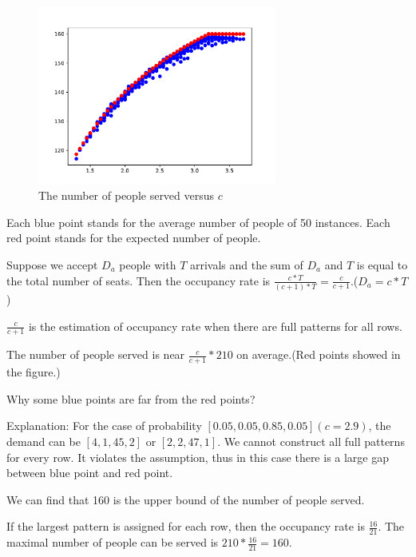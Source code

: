 \begin{figure}[ht]
  \centering
  \includegraphics[width = 0.7\textwidth]{./Figures/diff_2.pdf}
  \caption{The number of people served versus $c$}
\end{figure}

Each blue point stands for the average number of people of 50 instances.
Each red point stands for the expected number of people.

Suppose we accept $D_a$ people with $T$ arrivals and the sum of $D_a$ and $T$ is equal to the total number of seats. Then the occupancy rate is $\frac{c * T}{(c+1) * T}= \frac{c}{c+1}$.($D_a = c * T$)

$\frac{c}{c+1}$ is the estimation of occupancy rate when there are full patterns for all rows.

The number of people served is near $\frac{c}{c+1} * 210$ on average.(Red points showed in the figure.) 

Why some blue points are far from the red points? 

Explanation:
For the case of probability $[0.05, 0.05, 0.85, 0.05](c =2.9)$, the demand can be $[4, 1, 45, 2]$ or $[2, 2, 47, 1]$. We cannot construct all full patterns for every row. It violates the assumption, thus in this case there is a large gap between blue point and red point.

We can find that 160 is the upper bound of the number of people served. 

If the largest pattern is assigned for each row, then the occupancy rate is $\frac{16}{21}$. The maximal number of people can be served is $210 * \frac{16}{21} =160$. 


